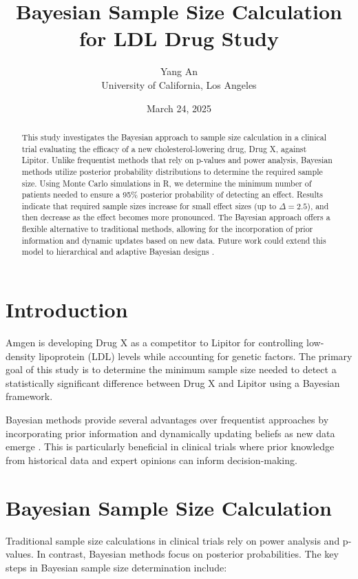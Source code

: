 \documentclass{article}
\title{Bayesian Sample Size Calculation for LDL Drug Study}
\author{Yang An \\ University of California, Los Angeles}
\date{March 24, 2025}
\begin{document}
	
	\maketitle
	
	\begin{abstract}
		This study investigates the Bayesian approach to sample size calculation in a clinical trial evaluating the efficacy of a new cholesterol-lowering drug, Drug X, against Lipitor. Unlike frequentist methods that rely on p-values and power analysis, Bayesian methods utilize posterior probability distributions to determine the required sample size. Using Monte Carlo simulations in R, we determine the minimum number of patients needed to ensure a 95\% posterior probability of detecting an effect. Results indicate that required sample sizes increase for small effect sizes (up to $\Delta = 2.5$), and then decrease as the effect becomes more pronounced. The Bayesian approach offers a flexible alternative to traditional methods, allowing for the incorporation of prior information and dynamic updates based on new data. Future work could extend this model to hierarchical and adaptive Bayesian designs \cite{Smith2023}.
	\end{abstract}
	
	\section{Introduction}
	Amgen is developing Drug X as a competitor to Lipitor for controlling low-density lipoprotein (LDL) levels while accounting for genetic factors. The primary goal of this study is to determine the minimum sample size needed to detect a statistically significant difference between Drug X and Lipitor using a Bayesian framework.
	
	Bayesian methods provide several advantages over frequentist approaches by incorporating prior information and dynamically updating beliefs as new data emerge \cite{Jones2024}. This is particularly beneficial in clinical trials where prior knowledge from historical data and expert opinions can inform decision-making.
	
	\section{Bayesian Sample Size Calculation}
	Traditional sample size calculations in clinical trials rely on power analysis and p-values. In contrast, Bayesian methods focus on posterior probabilities. The key steps in Bayesian sample size determination include:
	
\end{document}
